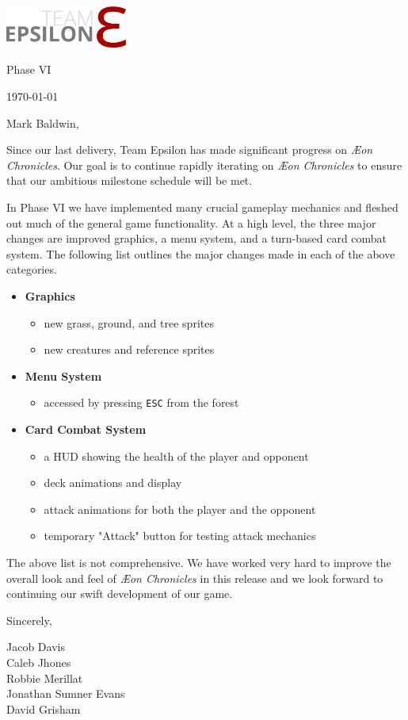 \documentclass[12pt]{article}
\newcommand\aeon{\textit{\AE on Chronicles}\xspace}
\newcommand\tab[1][.5in]{\hspace*{#1}}
\newcommand\phasenum{VI\xspace}
\newcommand\te{Team Epsilon\xspace}
\begin{document}
\hfill\includegraphics[width=4cm]{../graphics/logo/team-epsilon-light-cropped}

\hfill Phase \phasenum

\hfill \today

Mark Baldwin,

Since our last delivery, \te has made significant progress on \aeon. Our goal is
to continue rapidly iterating on \aeon to ensure that our ambitious milestone
schedule will be met.

In Phase \phasenum we have implemented many crucial gameplay mechanics and
fleshed out much of the general game functionality. At a high level, the three
major changes are improved graphics, a menu system, and a turn-based card combat
system. The following list outlines the major changes made in each of the above
categories.

\begin{itemize}
    \item \textbf{Graphics}
        \begin{itemize}
            \item new grass, ground, and tree sprites
            \item new creatures and reference sprites
        \end{itemize}

    \item \textbf{Menu System}
        \begin{itemize}
            \item accessed by pressing \texttt{ESC} from the forest
        \end{itemize}

    \item \textbf{Card Combat System}
        \begin{itemize}
            \item a HUD showing the health of the player and opponent
            \item deck animations and display
            \item attack animations for both the player and the opponent
            \item temporary "Attack" button for testing attack mechanics
        \end{itemize}
\end{itemize}

The above list is not comprehensive. We have worked very hard to improve the
overall look and feel of \aeon in this release and we look forward to continuing
our swift development of our game.

Sincerely,

\tab Jacob Davis \\
\tab Caleb Jhones \\
\tab Robbie Merillat \\
\tab Jonathan Sumner Evans \\
\tab David Grisham \\
\end{document}

